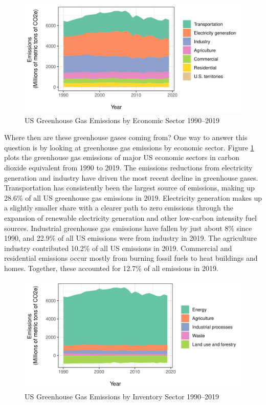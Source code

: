 \begin{figure}
\caption{US Greenhouse Gas Emissions by Economic Sector 1990--2019 \label{ghgeconomic}}
\centering
\includegraphics[scale=1]{figures/chapter1_figures/ghg_economic.png}
\end{figure}

Where then are these greenhouse gases coming from? One way to answer this question is by looking at greenhouse gas emissions by economic sector. Figure \ref{ghgeconomic} plots the greenhouse gas emissions of major US economic sectors in carbon dioxide equivalent from 1990 to 2019.  The emissions reductions from electricity generation and industry have driven the most recent decline in greenhouse gases. Transportation has consistently been the largest source of emissions, making up 28.6\% of all US greenhouse gas emissions in 2019. Electricity generation makes up a slightly smaller share with a clearer path to zero emissions through the expansion of renewable electricity generation and other low-carbon intensity fuel sources. Industrial greenhouse gas emissions have fallen by just about 8\% since 1990, and 22.9\% of all US emissions were from industry in 2019. The agriculture industry contributed 10.2\% of all US emissions in 2019. Commercial and residential emissions occur mostly from burning fossil fuels to heat buildings and homes. Together, these accounted for 12.7\% of all emissions in 2019. 

\begin{figure}
\caption{US Greenhouse Gas Emissions by Inventory Sector 1990--2019}
\centering
\includegraphics[scale=1]{figures/chapter1_figures/ghg_inventory.png}
\end{figure}

